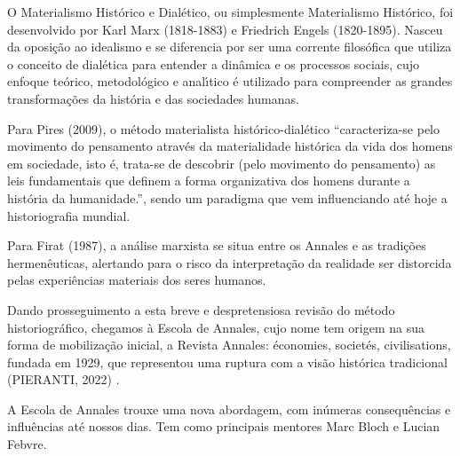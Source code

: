 \documentclass[
12pt,		%
openright,	%
twoside,  %
a4paper,			%
chapter=TITLE,		%
english,			%
french,				%
spanish,			%
brazil				%
]{USPSC-classe/USPSC}
\begin{document}
O Materialismo Hist\'orico e Dial\'etico, ou simplesmente Materialismo Hist\'orico, foi desenvolvido  por Karl Marx (1818-1883) e Friedrich Engels (1820-1895). Nasceu da oposi\c{c}\~ao ao idealismo e se diferencia por ser uma corrente filos\'ofica que utiliza o conceito de dial\'etica para entender a din\^amica e os processos sociais, cujo enfoque te\'orico, metodol\'ogico e anal\'{\i}tico \'e utilizado para compreender as grandes transforma\c{c}\~oes da hist\'oria e das sociedades humanas.









Para  Pires (2009), o m\'etodo materialista hist\'orico-dial\'etico “caracteriza-se pelo movimento do pensamento atrav\'es da materialidade hist\'orica da vida dos homens em sociedade, isto \'e, trata-se de descobrir (pelo movimento do pensamento) as leis fundamentais que definem a forma organizativa dos homens durante a hist\'oria da humanidade.”, sendo um paradigma que vem influenciando at\'e hoje a historiografia mundial.









Para Firat (1987), \textquotedbl a an\'alise marxista se situa entre os Annales e as tradi\c{c}\~oes hermen\^euticas\textquotedbl , alertando para o risco da interpreta\c{c}\~ao da realidade ser distorcida pelas \textquotedbl experi\^encias materiais dos seres humanos\textquotedbl .









Dando prosseguimento a esta breve e despretensiosa revis\~ao do m\'etodo historiogr\'afico, chegamos \`a Escola de Annales, cujo nome tem origem na sua forma de mobiliza\c{c}\~ao inicial, a Revista Annales: \'economies, societ\'es, civilisations, fundada em 1929, que representou uma ruptura com a vis\~ao hist\'orica tradicional (PIERANTI, 2022) .









A Escola de Annales trouxe uma nova abordagem, com in\'umeras consequ\^encias e influ\^encias at\'e nossos dias. Tem como principais mentores  Marc Bloch e Lucian Febvre.
\end{document}
